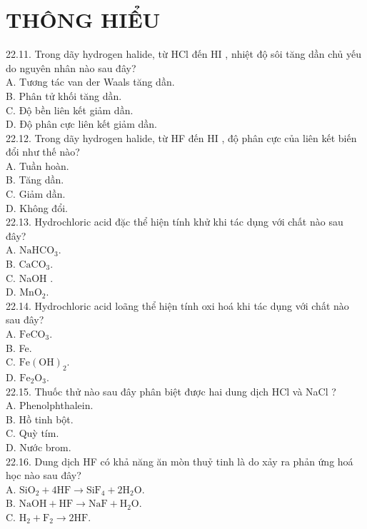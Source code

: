 \documentclass[10pt]{article}
\begin{document}
\section*{THÔNG HIỂU}
22.11. Trong dãy hydrogen halide, từ HCl đến HI , nhiệt độ sôi tăng dần chủ yếu do nguyên nhân nào sau đây?\\
A. Tương tác van der Waals tăng dần.\\
B. Phân tử khối tăng dần.\\
C. Độ bền liên kết giảm dần.\\
D. Độ phân cực liên kết giảm dần.\\
22.12. Trong dãy hydrogen halide, từ HF đến HI , độ phân cực của liên kết biến đổi như thế nào?\\
A. Tuần hoàn.\\
B. Tăng dần.\\
C. Giảm dần.\\
D. Không đổi.\\
22.13. Hydrochloric acid đặc thể hiện tính khử khi tác dụng với chất nào sau đây?\\
A. $\mathrm{NaHCO}_{3}$.\\
B. $\mathrm{CaCO}_{3}$.\\
C. NaOH .\\
D. $\mathrm{MnO}_{2}$.\\
22.14. Hydrochloric acid loãng thể hiện tính oxi hoá khi tác dụng với chất nào sau đây?\\
A. $\mathrm{FeCO}_{3}$.\\
B. Fe.\\
C. $\mathrm{Fe}(\mathrm{OH})_{2}$.\\
D. $\mathrm{Fe}_{2} \mathrm{O}_{3}$.\\
22.15. Thuốc thử nào sau đây phân biệt được hai dung dịch HCl và NaCl ?\\
A. Phenolphthalein.\\
B. Hồ tinh bột.\\
C. Quỳ tím.\\
D. Nước brom.\\
22.16. Dung dịch HF có khả năng ăn mòn thuỷ tinh là do xảy ra phản ứng hoá học nào sau đây?\\
A. $\mathrm{SiO}_{2}+4 \mathrm{HF} \longrightarrow \mathrm{SiF}_{4}+2 \mathrm{H}_{2} \mathrm{O}$.\\
B. $\mathrm{NaOH}+\mathrm{HF} \longrightarrow \mathrm{NaF}+\mathrm{H}_{2} \mathrm{O}$.\\
C. $\mathrm{H}_{2}+\mathrm{F}_{2} \longrightarrow 2 \mathrm{HF}$.\\
\end{document}
